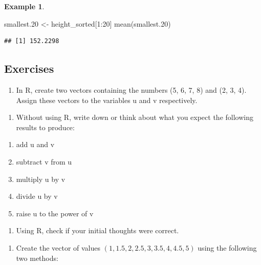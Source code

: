 \documentclass[
]{book}
\newenvironment{Shaded}{\begin{snugshade}}{\end{snugshade}}
\newcommand{\DecValTok}[1]{\textcolor[rgb]{0.00,0.00,0.81}{#1}}
\newcommand{\FloatTok}[1]{\textcolor[rgb]{0.00,0.00,0.81}{#1}}
\newcommand{\FunctionTok}[1]{\textcolor[rgb]{0.00,0.00,0.00}{#1}}
\newcommand{\NormalTok}[1]{#1}
\newcommand{\OtherTok}[1]{\textcolor[rgb]{0.56,0.35,0.01}{#1}}
\newcommand{\SpecialCharTok}[1]{\textcolor[rgb]{0.00,0.00,0.00}{#1}}
\providecommand{\tightlist}{%
  \setlength{\itemsep}{0pt}\setlength{\parskip}{0pt}}
\theoremstyle{definition}
\theoremstyle{definition}
\newtheorem{example}{Example}[chapter]
\theoremstyle{definition}
\theoremstyle{definition}
\theoremstyle{remark}
\begin{document}
\begin{example}
\begin{Shaded}
\begin{Highlighting}[]
\NormalTok{smallest}\FloatTok{.20} \OtherTok{\textless{}{-}}\NormalTok{ height\_sorted[}\DecValTok{1}\SpecialCharTok{:}\DecValTok{20}\NormalTok{]}
\FunctionTok{mean}\NormalTok{(smallest}\FloatTok{.20}\NormalTok{)}
\end{Highlighting}
\end{Shaded}

\begin{verbatim}
## [1] 152.2298
\end{verbatim}

\end{example}

\hypertarget{exercises}{%
\subsection{Exercises}\label{exercises}}

\begin{enumerate}
\def\labelenumi{\arabic{enumi}.}
\tightlist
\item
  In R, create two vectors containing the numbers (5, 6, 7, 8) and (2, 3, 4). Assign these vectors to the variables u and v respectively.
\end{enumerate}

\begin{enumerate}
\def\labelenumi{\roman{enumi}.}
\tightlist
\item
  Without using R, write down or think about what you expect the following results to produce:
\end{enumerate}

\begin{enumerate}
\def\labelenumi{\alph{enumi}.}
\tightlist
\item
  add u and v
\item
  subtract v from u
\item
  multiply u by v
\item
  divide u by v
\item
  raise u to the power of v
\end{enumerate}

\begin{enumerate}
\def\labelenumi{\roman{enumi}.}
\setcounter{enumi}{1}
\tightlist
\item
  Using R, check if your initial thoughts were correct.
\end{enumerate}

\begin{enumerate}
\def\labelenumi{\arabic{enumi}.}
\setcounter{enumi}{1}
\tightlist
\item
  Create the vector of values \((1, 1.5, 2, 2.5, 3, 3.5, 4, 4.5, 5)\) using the following two methods:
\end{enumerate}
\end{document}
